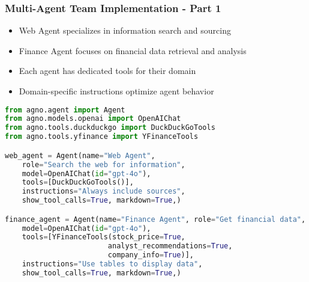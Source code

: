 \begin{frame}[fragile]\frametitle{Multi-Agent Team Implementation - Part 1}
      \begin{itemize}
	\item Web Agent specializes in information search and sourcing
	\item Finance Agent focuses on financial data retrieval and analysis
	\item Each agent has dedicated tools for their domain
	\item Domain-specific instructions optimize agent behavior
	  \end{itemize}
      
      \begin{lstlisting}[language=python, basicstyle=\tiny]
from agno.agent import Agent
from agno.models.openai import OpenAIChat
from agno.tools.duckduckgo import DuckDuckGoTools
from agno.tools.yfinance import YFinanceTools

web_agent = Agent(name="Web Agent",
    role="Search the web for information",
    model=OpenAIChat(id="gpt-4o"),
    tools=[DuckDuckGoTools()],
    instructions="Always include sources",
    show_tool_calls=True, markdown=True,)

finance_agent = Agent(name="Finance Agent", role="Get financial data",
    model=OpenAIChat(id="gpt-4o"),
    tools=[YFinanceTools(stock_price=True, 
                        analyst_recommendations=True,
                        company_info=True)],
    instructions="Use tables to display data",
    show_tool_calls=True, markdown=True,)
      \end{lstlisting}
\end{frame}


